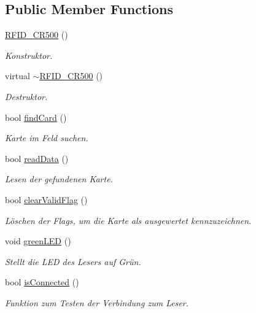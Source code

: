 \subsection*{Public Member Functions}
\begin{CompactItemize}
\item 
\hyperlink{class_r_f_i_d___c_r500_2d028be0db1277a8feca1cfbd4f5619e}{RFID\_\-CR500} ()
\begin{CompactList}\small\item\em Konstruktor. \item\end{CompactList}\item 
virtual \hyperlink{class_r_f_i_d___c_r500_766c86b545f284a11e285305e88cd97a}{$\sim$RFID\_\-CR500} ()
\begin{CompactList}\small\item\em Destruktor. \item\end{CompactList}\item 
bool \hyperlink{class_r_f_i_d___c_r500_7d3f44b888f7da7cea83111f41bb6d95}{findCard} ()
\begin{CompactList}\small\item\em Karte im Feld suchen. \item\end{CompactList}\item 
bool \hyperlink{class_r_f_i_d___c_r500_0ff3f9ea5a0d59d36532bcdd21854755}{readData} ()
\begin{CompactList}\small\item\em Lesen der gefundenen Karte. \item\end{CompactList}\item 
bool \hyperlink{class_r_f_i_d___c_r500_2062849e5d875fb74e71c631468e40c1}{clearValidFlag} ()
\begin{CompactList}\small\item\em Löschen der Flags, um die Karte als ausgewertet kennzuzeichnen. \item\end{CompactList}\item 
void \hyperlink{class_r_f_i_d___c_r500_c72b02ffc4c4b42cfdb97fbed3a2eb97}{greenLED} ()
\begin{CompactList}\small\item\em Stellt die LED des Lesers auf Grün. \item\end{CompactList}\item 
bool \hyperlink{class_r_f_i_d___c_r500_b349b713f9636e8f3c04ca4295bc3248}{isConnected} ()
\begin{CompactList}\small\item\em Funktion zum Testen der Verbindung zum Leser. \item\end{CompactList}\end{CompactItemize}
